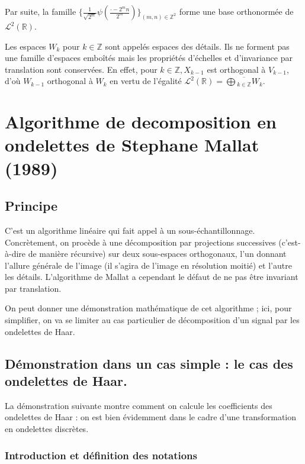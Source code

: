 \documentclass{article}
\begin{document}
Par suite, la famille $\displaystyle \{\frac{1}{\sqrt{2^m}}\psi(\frac{\cdot - 2^{m}n}{2^m})\}_{(m,n)\in\mathbb{Z}^2}$ forme une base orthonormée de $\mathcal{L}^2(\mathbb{R})$.

Les espaces $W_k$ pour $k\in\mathbb{Z}$ sont appelés espaces des détails. Ils ne forment pas une famille d'espaces emboîtés mais les propriétés d'échelles et d'invariance par translation sont conservées. En effet, pour $k \in \mathbb{Z}, X_{k-1}$ est orthogonal à $V_{k-1}$, d'où $W_{k-1}$ orthogonal à $W_k$ en vertu de l'égalité $\displaystyle \mathcal{L}^2(\mathbb{R}) = \overline{\bigoplus{}_{k\in\mathbb{Z}}W_k}$.




\section{Algorithme de decomposition en ondelettes de Stephane Mallat (1989)}

\subsection{Principe}

C’est un algorithme linéaire qui fait appel à un sous-échantillonnage. Concrètement, on procède à une décomposition par projections successives (c’est-à-dire de manière récursive) sur deux sous-espaces orthogonaux, l’un donnant l’allure générale de l’image (il s'agira de l'image en résolution moitié) et l’autre les détails. 
L’algorithme de Mallat a cependant le défaut de ne pas être invariant par translation.

On peut donner une démonstration mathématique de cet algorithme ; ici, pour simplifier, on va se limiter au cas particulier de décomposition d’un signal par les ondelettes de Haar.


\subsection{Démonstration dans un cas simple : le cas des ondelettes de Haar.}

La démonstration suivante montre comment on calcule les coefficients des ondelettes de Haar : on est bien évidemment dans le cadre d'une transformation en ondelettes discrètes.

\subsubsection{Introduction et définition des notations}
\end{document}
